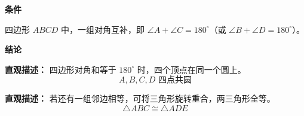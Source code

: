 \begin{statementbox}
	\textbf{\textcolor{CStatement}{条件}}
	\begin{description}[style=nextline, leftmargin=2.8em, labelsep=0.5em, itemsep=0.35em]
		\item[\textbf{\textcolor{CStatement}{条件1（对角互补）：}}]
			四边形 $ABCD$ 中，一组对角互补，即 $\angle A+\angle C=180^\circ$（或 $\angle B+\angle D=180^\circ$）。
	\end{description}
	\textbf{\textcolor{CStatement}{结论}}
	\begin{description}[style=nextline, leftmargin=2.8em, labelsep=0.5em, itemsep=0.45em]
		\item[\textbf{\textcolor{CStatement}{结论一（四点共圆）：}}]
			\textbf{\textcolor{CStatement}{直观描述：}}
			四边形对角和等于 $180^\circ$ 时，四个顶点在同一个圆上。
			\[
				A,B,C,D \text{ 四点共圆}
			\]
		\item[\textbf{\textcolor{CStatement}{推广结论（旋转全等）：}}]
			\textbf{\textcolor{CStatement}{直观描述：}}
			若还有一组邻边相等，可将三角形旋转重合，两三角形全等。
			\[
				\triangle ABC \cong \triangle ADE
			\]
	\end{description}

\end{statementbox}
